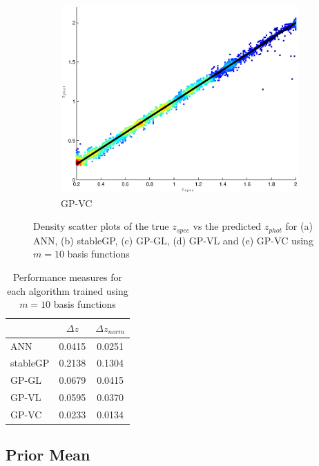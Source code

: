 \documentclass[useAMS,usenatbib,fleqn]{mn2e}
\begin{document}
\begin{figure}
\begin{subfigure}[b]{0.175\textwidth}
                \includegraphics[width=\textwidth]{figures/GPVC.eps}
                \caption{GP-VC}
        \end{subfigure}
        
        \caption{Density scatter plots of the true $z_{spec}$ vs the predicted $z_{phot}$ for (a) ANN, (b) stableGP, (c) GP-GL, (d) GP-VL and (e) GP-VC using $m=10$ basis functions}
        \label{fig-experiment-1}
\end{figure}

 \begin{table}
\caption{Performance measures for each algorithm trained using $m=10$ basis functions}
\begin{center}
  \begin{tabular}{| l | c | c | }
     				&	$\Delta z$	&	$\Delta z_{norm}$	\\	\hline
	ANN		&	0.0415		&	0.0251				\\	 
	stableGP	&	0.2138		&	0.1304				\\ 
	GP-GL		&	0.0679		&	0.0415				\\
	GP-VL		&	0.0595		&	0.0370				\\
	GP-VC		&	0.0233		&	0.0134				\\	\hline
  \end{tabular}
  \label{table-experiment-1}
\end{center}
\end{table}

\subsection{Prior Mean}
\end{document}
